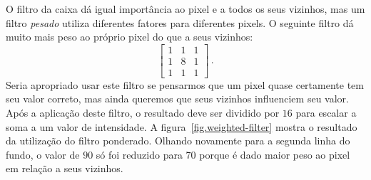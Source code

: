 
O filtro da caixa dá igual importância ao pixel e a todos os seus vizinhos, mas um filtro \emph{pesado} utiliza diferentes fatores para diferentes pixels. O seguinte filtro dá muito mais peso ao próprio pixel do que a seus vizinhos:
\[
\left[
\begin{array}{ccc}
1 & 1 & 1\\
1 & 8 & 1\\
1 & 1 & 1
\end{array}
\right]\,.
\]
Seria apropriado usar este filtro se pensarmos que um pixel quase certamente tem seu valor correto, mas ainda queremos que seus vizinhos influenciem seu valor. Após a aplicação deste filtro, o resultado deve ser dividido por $16$ para escalar a soma a um valor de intensidade. A figura~\ref{fig.weighted-filter} mostra o resultado da utilização do filtro ponderado. Olhando novamente para a segunda linha do fundo, o valor de $90$ só foi reduzido para $70$ porque é dado maior peso ao pixel em relação a seus vizinhos.

